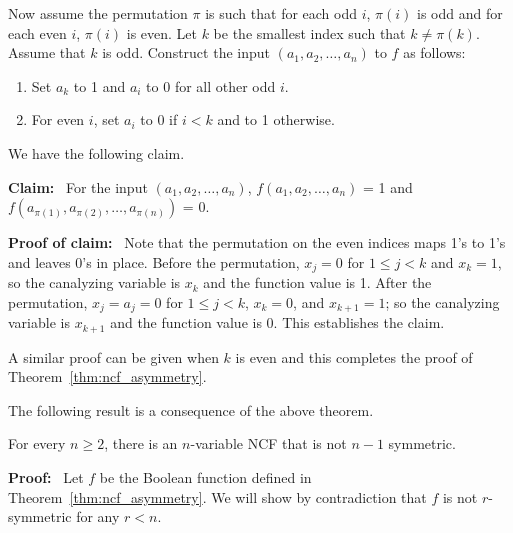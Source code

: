 \smallskip
Now assume the permutation $\pi$ is such that for each odd $i$, $\pi(i)$ is odd 
and for each even $i$, $\pi(i)$ is even.
Let $k$ be the smallest index such that $k \neq \pi(k)$.
Assume that $k$  is odd. 
Construct the input $(a_1, a_2, \ldots,  a_n)$ to $f$ as follows: 
\begin{enumerate}
\item Set $a_k$ to 1 and $a_i$ to 0 for all other odd $i$. 
\item For even $i$, set $a_i$ to 0 if $i < k$ and to 1 otherwise. 
\end{enumerate}
We have the following claim.

\smallskip
\noindent
\textbf{Claim:}~ For the input $(a_1, a_2, \ldots, a_n)$, 
$f(a_1, a_2, \ldots, a_n)$ = 1 and
$f(a_{\pi(1)}, a_{\pi(2)}, \ldots, a_{\pi(n)})$ = 0.

\smallskip
\noindent
\textbf{Proof of claim:}~ Note that the permutation
on the even indices maps 1's to 1's and leaves 0's in place.  
Before the permutation,  
$x_j = 0$ for $1 \leq j < k$ and $x_k = 1$,
so the canalyzing variable is $x_k$ and the function value is 1.
After the permutation, 
$x_j = a_j = 0$ for $1 \leq j < k$,
$x_k = 0$, and $x_{k+1} = 1$;
so the canalyzing variable is $x_{k+1}$ and the function value is 0.
This establishes the claim. 

A similar proof can be given when $k$ is even and this completes
the proof of Theorem~\ref{thm:ncf_asymmetry}.
\QED

\noindent
The following result is a consequence of the above theorem.

\begin{corollary}\label{cor:ncf_not_rsymm}
For every $n \geq 2$, there is an $n$-variable NCF that is not $n-1$ symmetric.
\end{corollary}

\noindent
\textbf{Proof:}~ 
Let $f$ be the Boolean function defined in Theorem~\ref{thm:ncf_asymmetry}.
We will show by contradiction that $f$ is not $r$-symmetric for any $r < n$.

